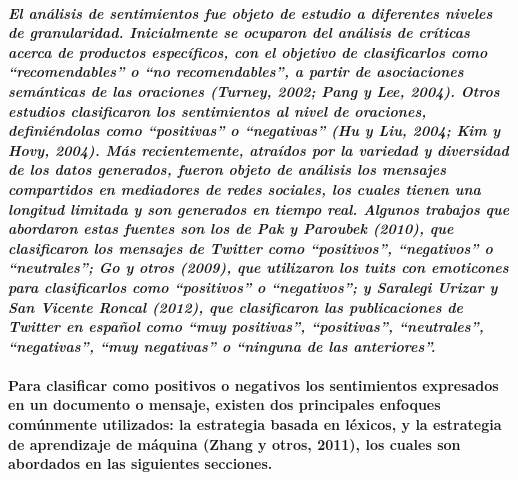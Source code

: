 \paragraph{\textit{El an\'alisis de sentimientos fue objeto de estudio a diferentes niveles de granularidad. Inicialmente se ocuparon del an\'alisis de cr\'iticas acerca de productos espec\'ificos, con el objetivo de clasificarlos como ``recomendables'' o ``no recomendables'', a partir de asociaciones sem\'anticas de las oraciones (Turney, 2002; Pang y Lee, 2004). Otros estudios clasificaron los sentimientos al nivel de oraciones, defini\'endolas como ``positivas'' o ``negativas'' (Hu y Liu, 2004; Kim y Hovy, 2004). M\'as recientemente, atra\'idos por la variedad y diversidad de los datos generados, fueron objeto de an\'alisis los mensajes compartidos en mediadores de redes sociales, los cuales tienen una longitud limitada y son generados en tiempo real. Algunos trabajos que abordaron estas fuentes son los de Pak y Paroubek (2010), que clasificaron los mensajes de Twitter como ``positivos'', ``negativos'' o ``neutrales''; Go y otros (2009), que utilizaron los tuits con emoticones para clasificarlos como ``positivos'' o ``negativos''; y Saralegi Urizar y San Vicente Roncal (2012), que clasificaron las publicaciones de Twitter en espa\~nol como ``muy positivas'', ``positivas'', ``neutrales'', ``negativas'', ``muy negativas'' o ``ninguna de las anteriores''.}}

\paragraph{Para clasificar como positivos o negativos los sentimientos expresados en un documento o mensaje, existen dos principales enfoques com\'unmente utilizados: la estrategia basada en l\'exicos, y la estrategia de aprendizaje de m\'aquina (Zhang y otros, 2011), los cuales son abordados en las siguientes secciones. }
